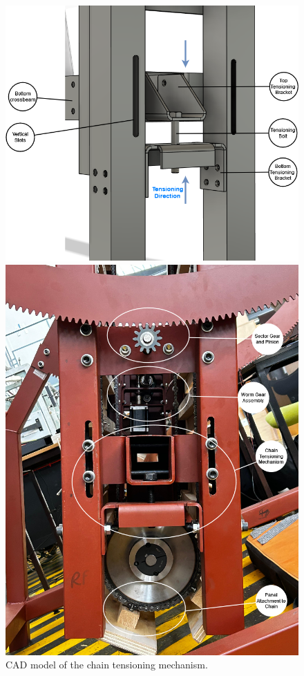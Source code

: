 \begin{figure}[H]
    \centering
    \begin{minipage}[b]{0.55\linewidth}
        \centering
        \includegraphics[width=\linewidth]{figs/final_design/chain-tension-CAD.png}
        \caption{CAD model of the chain tensioning mechanism.}
        \label{fig:chain-tensioning-CAD}
    \end{minipage}
    \hspace{0.05\linewidth}
    \begin{minipage}[b]{0.35\linewidth}
        \centering
        \includegraphics[width=\linewidth]{figs/final_design/side-mechanisms-photo.png}

\end{minipage}
\end{figure}
